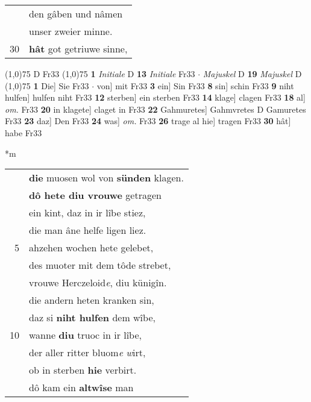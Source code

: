 \documentclass[8pt,a4paper,notitlepage]{article}
\begin{document}
\begin{table}[ht]
\begin{minipage}[t]{0.5\linewidth}
\begin{tabular}{rl}
 & den gâben und nâmen\\ 
 & unser zweier minne.\\ 
30 & \textbf{hât} got getriuwe sinne,\\ 
\end{tabular}
\scriptsize
\line(1,0){75} \newline
D Fr33 \newline
\line(1,0){75} \newline
\textbf{1} \textit{Initiale} D  \textbf{13} \textit{Initiale} Fr33   $\cdot$ \textit{Majuskel} D  \textbf{19} \textit{Majuskel} D  \newline
\line(1,0){75} \newline
\textbf{1} Die] Sie Fr33  $\cdot$ von] mit Fr33 \textbf{3} ein] Sin Fr33 \textbf{8} sin] schin Fr33 \textbf{9} niht hulfen] hulfen niht Fr33 \textbf{12} sterben] ein sterben Fr33 \textbf{14} klage] clagen Fr33 \textbf{18} al] \textit{om.} Fr33 \textbf{20} in klagete] claget in Fr33 \textbf{22} Gahmuretes] Gahmvretes D Gamuretes Fr33 \textbf{23} daz] Den Fr33 \textbf{24} was] \textit{om.} Fr33 \textbf{26} trage al hie] tragen Fr33 \textbf{30} hât] habe Fr33 \newline
\end{minipage}
\hspace{0.5cm}
\begin{minipage}[t]{0.5\linewidth}
\small
\begin{center}*m
\end{center}
\begin{tabular}{rl}
 & \textbf{die} muosen wol von \textbf{sünden} klagen.\\ 
 & \textbf{dô hete diu vrouwe} getragen\\ 
 & ein kint, daz in ir lîbe stiez,\\ 
 & die man âne helfe ligen liez.\\ 
5 & ahzehen wochen hete gelebet,\\ 
 & des muoter mit dem tôde strebet,\\ 
 & vrouwe Herczeloid\textit{e}, diu künigîn.\\ 
 & die andern heten kranken sin,\\ 
 & daz si \textbf{niht hulfen} dem wîbe,\\ 
10 & wanne \textbf{diu} truoc in ir lîbe,\\ 
 & der aller ritter bluom\textit{e} \textit{w}irt,\\ 
 & ob in sterben \textbf{hie} verbirt.\\ 
 & dô kam ein \textbf{altwîse} man\\ 

\end{tabular}
\end{minipage}
\end{table}
\end{document}
